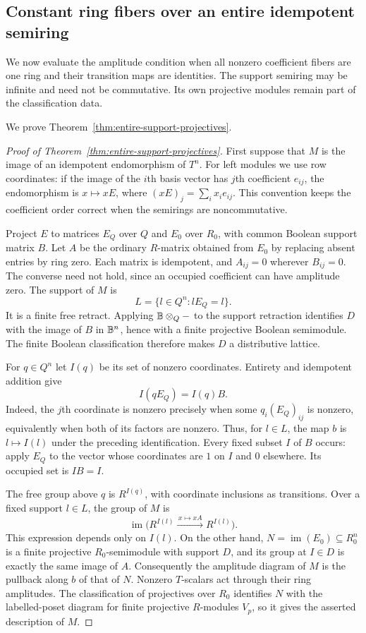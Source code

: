 \subsection{Constant ring fibers over an entire idempotent semiring}
\label{sec:entire-support}

We now evaluate the amplitude condition when all nonzero coefficient fibers
are one ring and their transition maps are identities. The support semiring
may be infinite and need not be commutative. Its own projective modules
remain part of the classification data.

We prove Theorem~\ref{thm:entire-support-projectives}.



\begin{proof}[Proof of Theorem~\ref{thm:entire-support-projectives}]
First suppose that $M$ is the image of an idempotent endomorphism of
$T^n$. For left modules we use row coordinates: if the image of the
$i$th basis vector has $j$th coefficient $e_{ij}$, the endomorphism is
$x\mapsto xE$, where $(xE)_j=\sum_i x_i e_{ij}$. This convention
keeps the coefficient order correct when the semirings are
noncommutative.

Project $E$ to matrices $E_Q$ over $Q$ and $E_0$ over $R_0$, with
common Boolean support matrix $B$. Let $A$ be the ordinary $R$-matrix
obtained from $E_0$ by replacing absent entries by ring zero. Each
matrix is idempotent, and $A_{ij}=0$ wherever $B_{ij}=0$. The converse
need not hold, since an occupied coefficient can have amplitude zero.
The support of $M$ is
\[
 L=\{l\in Q^n:lE_Q=l\}.
\]
It is a finite free retract. Applying $\mathbb B\otimes_Q-$ to the support
retraction identifies $D$ with the image of $B$ in $\mathbb B^n$, hence with a
finite projective Boolean semimodule. The finite Boolean classification
therefore makes $D$ a distributive lattice.

For $q\in Q^n$ let $I(q)$ be its set of nonzero coordinates.
Entirety and idempotent addition give
\[
 I(qE_Q)=I(q)B.
\]
Indeed, the $j$th coordinate is nonzero precisely when some
$q_i(E_Q)_{ij}$ is nonzero, equivalently when both of its factors are
nonzero. Thus, for $l\in L$, the map $b$ is $l\mapsto I(l)$ under
the preceding identification. Every fixed subset $I$ of $B$ occurs:
apply $E_Q$ to the vector whose coordinates are $1$ on $I$ and $0$
elsewhere. Its occupied set is $IB=I$.

The free group above $q$ is $R^{I(q)}$, with coordinate inclusions as
transitions. Over a fixed support $l\in L$, the group of $M$ is
\[
 \operatorname{im}\bigl(R^{I(l)}\xrightarrow{\,x\mapsto xA\,}
                              R^{I(l)}\bigr).
\]
This expression depends only on $I(l)$. On the other hand,
$N=\operatorname{im}(E_0)\subseteq R_0^n$ is a finite projective
$R_0$-semimodule with support $D$, and its group at $I\in D$ is
exactly the same image of $A$. Consequently the amplitude diagram of
$M$ is the pullback along $b$ of that of $N$. Nonzero $T$-scalars act
through their ring amplitudes. The classification of projectives over
$R_0$ identifies $N$ with the labelled-poset diagram for finite
projective $R$-modules $V_p$, so it gives the asserted description of
$M$.


\end{proof}
